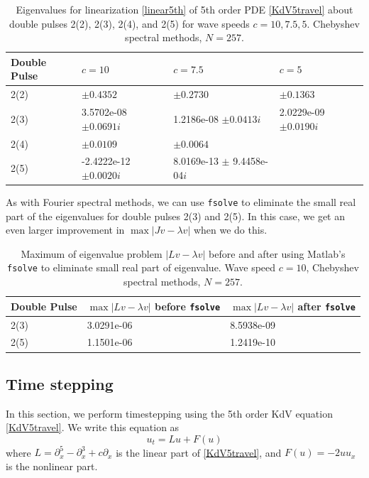 \documentclass[12pt]{article}
\begin{document}
\begin{table}[H]
\begin{tabular}{l|lll}
 Double Pulse   & $c = 10$            & $c=7.5$                        & $c=5$        \\ \hline
  2(2) &     $\pm 0.4352$             & $\pm 0.2730$                   & $\pm 0.1363$ \\ 
  2(3) &     3.5702e-08 $\pm 0.0691i$ & 1.2186e-08 $\pm 0.0413i$       & 2.0229e-09 $\pm 0.0190i$\\ 
  2(4) &     $\pm 0.0109$             & $\pm 0.0064$                   & \\ 
  2(5) &    -2.4222e-12 $\pm 0.0020i$ & 8.0169e-13 $\pm$ 9.4458e-04$i$ & \\
\end{tabular}
\caption{Eigenvalues for linearization \eqref{linear5th} of 5th order PDE \eqref{KdV5travel} about double pulses 2(2), 2(3), 2(4), and 2(5) for wave speeds $c = 10, 7.5, 5$. Chebyshev spectral methods, $N = 257$.}
\end{table}

As with Fourier spectral methods, we can use \texttt{fsolve} to eliminate the small real part of the eigenvalues for double pulses 2(3) and 2(5). In this case, we get an even larger improvement in $\max{|Jv - \lambda v|}$ when we do this.

\begin{table}[H]
\begin{tabular}{l|ll}
 Double Pulse   & $\max{|Lv - \lambda v|}$ before \texttt{fsolve} & $\max{|Lv - \lambda v|}$ after \texttt{fsolve}\\ \hline
  2(3) & 3.0291e-06 & 8.5938e-09 \\
  2(5) & 1.1501e-06 & 1.2419e-10 \\
\end{tabular}
\caption{Maximum of eigenvalue problem $|Lv - \lambda v|$ before and after using Matlab's \texttt{fsolve} to eliminate small real part of eigenvalue. Wave speed $c = 10$, Chebyshev spectral methods, $N = 257$.}
\end{table}

\subsection{Time stepping}

In this section, we perform timestepping using the 5th order KdV equation \eqref{KdV5travel}. We write this equation as 
\begin{equation} \label{KdV5separated}
u_t = Lu + F(u)
\end{equation}
where $L = \partial_x^5 - \partial_x^3 + c \partial_x$ is the linear part of \eqref{KdV5travel}, and $F(u) = -2 u u_x$ is the nonlinear part.\\
\end{document}
